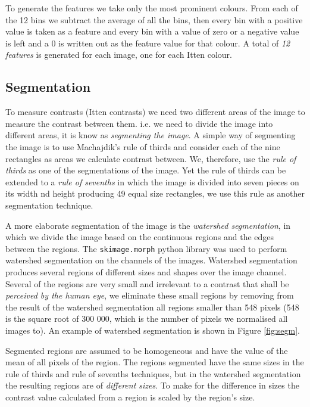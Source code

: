 \documentclass[11pt,a4paper,twoside,openright,draft]{report}
\begin{document}
\begin{multicols}{2}
To generate the features we take only the most prominent colours.  From each of
the 12 bins we subtract the average of all the bins, then every bin with a
positive value is taken as a feature and every bin with a value of zero or a
negative value is left and a 0 is written out as the feature value for that
colour.  A total of \emph{12 features} is generated for each image, one for
each Itten colour.

\subsection{Segmentation}

To measure contrasts (Itten contrasts) we need two different areas of the image
to measure the contrast between them.  i.e. we need to divide the image into
different areas, it is know as \emph{segmenting the image}.  A simple way of
segmenting the image is to use Machajdik's rule of thirds \cite{mach10clas} and
consider each of the nine rectangles as areas we calculate contrast between.
We, therefore, use the \emph{rule of thirds} as one of the segmentations of the
image.  Yet the rule of thirds can be extended to a \emph{rule of sevenths} in
which the image is divided into seven pieces on its width nd height producing
49 equal size rectangles, we use this rule as another segmentation technique.

A more elaborate segmentation of the image is the \emph{watershed
segmentation}, in which we divide the image based on the continuous regions and
the edges between the regions.  The \texttt{skimage.morph} python library was
used to perform watershed segmentation on the channels of the images.
Watershed segmentation produces several regions of different sizes and shapes
over the image channel.  Several of the regions are very small and irrelevant
to a contrast that shall be \emph{perceived by the human eye}, we eliminate
these small regions by removing from the result of the watershed segmentation
all regions smaller than 548 pixels (548 is the square root of 300 000, which
is the number of pixels we normalised all images to).  An example of watershed
segmentation is shown in Figure \ref{fig:segm}.

Segmented regions are assumed to be homogeneous and have the value of the mean
of all pixels of the region.  The regions segmented have the same sizes in the
rule of thirds and rule of sevenths techniques, but in the watershed
segmentation the resulting regions are of \emph{different sizes}.  To make for
the difference in sizes the contrast value calculated from a region is scaled
by the region's size.


\end{multicols}
\end{document}
